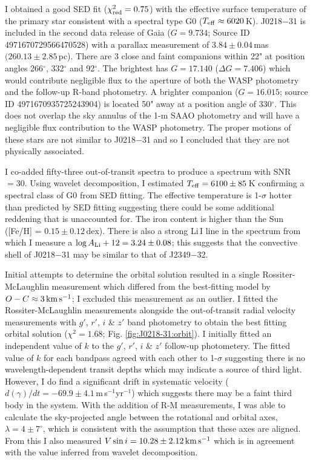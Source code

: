 I obtained a good SED fit ($\chi_{\rm red}^2 = 0.75$) with the effective surface temperature of the primary star consistent with a spectral type G0 ($T_{\rm eff} \approx 6020$\,K). J0218$-$31 is included in the second data release of Gaia ($G = 9.734$; Source ID 4971670729566470528) with a parallax measurement of $3.84 \pm 0.04$\,mas $ (260.13 \pm  2.85$\,pc). There are 3 close and faint companions within 22" at position angles 266$^\circ$, 332$^\circ$ and 92$^\circ$. The brightest has $G = 17.140$ ($\Delta G = 7.406$) which would contribute negligible flux to the aperture of both the WASP photometry and the follow-up R-band photometry. A brighter companion ($G = 16.015$; source ID 4971670935725243904) is located 50" away at a position angle of 330$^\circ$. This does not overlap the sky annulus of the 1-m SAAO photometry and will have a negligible flux contribution to the WASP photometry. The proper motions of these stars are not similar to J0218$-$31 and so I concluded that they are not physically associated.

I co-added fifty-three out-of-transit spectra to produce a spectrum with SNR $=30$. Using wavelet decomposition, I estimated $T_{\rm eff} = 6100 \pm 85$\,K confirming a spectral class of G0 from SED fitting. The effective temperature is 1-$\sigma$ hotter than predicted by SED fitting suggesting there could be some additional reddening that is unaccounted for. The iron content is higher than the Sun ([Fe/H] = $0.15 \pm 0.12$\,dex). There is also a strong Li\,I  line in the spectrum from which I measure a $\log A_{\rm Li}+12= 3.24 \pm 0.08$; this suggests that the convective shell of J0218$-$31 may be similar to that of J2349$-$32.

Initial attempts to determine the orbital solution resulted in a single Rossiter-McLaughlin measurement which differed from the best-fitting model by $O-C \approx 3\,\rm km\,s^{-1}$; I excluded this measurement as an outlier. I fitted the Rossiter-McLaughlin measurements alongside the out-of-transit radial velocity measurements with $g'$, $r'$, $i$ \& $z'$ band photometry to obtain the best fitting orbital solution ($\chi^2 = 1.68$; Fig. \ref{fig:J0218-31:orbit}). I initially fitted an independent value of $k$ to the $g'$, $r'$, $i$ \& $z'$ follow-up photometery. The fitted value of $k$ for each bandpass agreed with each other to 1-$\sigma$ suggesting there is no wavelength-dependent transit depths which may indicate a source of third light. However, I do find a significant drift in systematic velocity ($d(\gamma)/dt = -69.9 \pm 4.1$\,m\,s$^{-1}$yr$^{-1}$) which suggests there may be a faint third body in the system. With the addition of R-M measurements, I was able to calculate the sky-projected angle between the rotational and orbital axes, $\lambda = 4 \pm 7 ^\circ$, which is consistent with the assumption that these axes are aligned.  From this I also measured $V \sin i =  10.28 \pm 2.12\, \rm km\,s^{-1}$ which is in agreement with the value inferred from wavelet decomposition.

